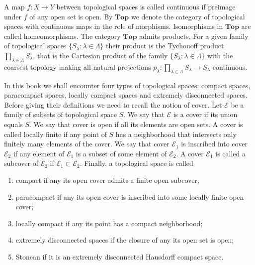 A map $f:X\to Y$ between topological spaces is called continuous if preimage
under $f$ of any open set is open. By $\mathbf{Top}$ we denote the category of
topological spaces with continuous maps in the role of morphisms. Isomorphisms
in $\mathbf{Top}$ are called homeomorphisms. The category $\mathbf{Top}$ admits
products. For a given family of topological spaces $
\{S_\lambda:\lambda\in\Lambda \}$ their product is the Tychonoff product
$\prod_{\lambda\in\Lambda}S_\lambda$, that is the Cartesian product of the
family $ \{S_\lambda:\lambda\in\Lambda \}$ with the coarsest topology making all
natural projections $p_\lambda:\prod_{\lambda\in\Lambda}S_\lambda\to S_\lambda$
continuous.

In this book we shall encounter four types of topological spaces: compact
spaces, paracompact spaces, locally compact spaces and extremely disconnected
spaces. Before giving their definitions we need to recall the notion of cover.
Let $\mathcal{E}$ be a family of subsets of topological space $S$. We say that
$\mathcal{E}$ is a cover if its union equals $S$. We say that cover is open if
all its elements are open sets. A cover is called locally finite if any point of
$S$ has a neighborhood that intersects only finitely many elements of the cover.
We say that cover $\mathcal{E}_1$ is inscribed into cover $\mathcal{E}_2$ if any
element of $\mathcal{E}_1$ is a subset of some element of $\mathcal{E}_2$. A
cover $\mathcal{E}_1$ is called a subcover of $\mathcal{E}_2$ if
$\mathcal{E}_1\subset\mathcal{E}_2$. Finally, a topological space is called 
\begin{enumerate}[label = (\roman*)]
  \item compact if any its open cover admits a finite open subcover; 

  \item paracompact if any its open cover is inscribed into some locally finite
  open cover; 

  \item locally compact if any its point has a compact neighborhood;

  \item extremely disconnected spaces if the closure of any its open set is
  open;

  \item Stonean if it is an extremely disconnected Hausdorff compact space.
\end{enumerate}

